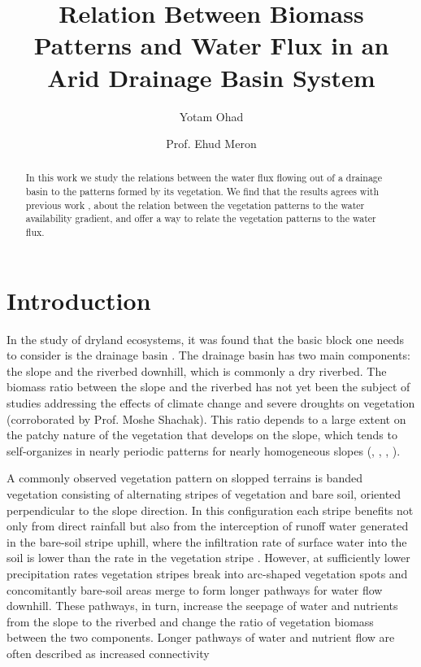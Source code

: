 \documentclass{article}
\title{Relation Between Biomass Patterns and Water Flux in an Arid Drainage Basin System}
\author{Yotam Ohad \and Prof. Ehud Meron}
\numberwithin{equation}{section}
\begin{document}
\maketitle

\begin{abstract}
    In this work we study the relations between the water flux flowing out of a drainage basin to the patterns formed by its vegetation. We find that the results agrees with previous work \parencite[]{meron_vegetation_2004}, about the relation between the vegetation patterns to the water availability gradient, and offer a way to relate the vegetation patterns to the water flux.
\end{abstract}

\section{Introduction}
In the study of dryland ecosystems, it was found that the basic block one needs to consider is the drainage basin \parencite{yair_case_1982}. The drainage basin has two main components: the slope and the riverbed downhill, which is commonly a dry riverbed. The biomass ratio between the slope and the riverbed has not yet been the subject of studies addressing the effects of climate change and severe droughts on vegetation (corroborated by Prof. Moshe Shachak). This ratio depends to a large extent on the patchy nature of the vegetation that develops on the slope, which tends to self-organizes in nearly periodic patterns for nearly homogeneous slopes (\cite{lefever_origin_1997}, \cite{valentin_soil_1999}, \cite{klausmeier_regular_1999}, \cite{von_hardenberg_diversity_2001}).

A commonly observed vegetation pattern on slopped terrains is banded vegetation consisting of alternating stripes of vegetation and bare soil, oriented perpendicular to the slope direction. In this configuration each stripe benefits not only from direct rainfall but also from the interception of runoff water generated in the bare-soil stripe uphill, where the infiltration rate of surface water into the soil is lower than the rate in the vegetation stripe \parencite{meron_vegetation_2019}. However, at sufficiently lower precipitation rates vegetation stripes break into arc-shaped vegetation spots and concomitantly bare-soil areas merge to form longer pathways for water flow downhill. These pathways, in turn, increase the seepage of water and nutrients from the slope to the riverbed and change the ratio of vegetation biomass between the two components. Longer pathways of water and nutrient flow are often described as increased connectivity \parencite{okin_connectivity_2015}
\end{document}
